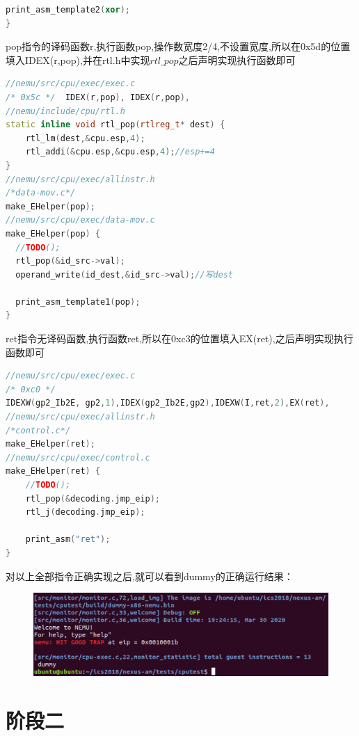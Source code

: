 \documentclass[UTF8,a4paper,10pt]{ctexart}
\begin{document}
{\begin{lstlisting}[title=xor指令实现,frame=trbl,language={C++}]
  print_asm_template2(xor);
}
     \end{lstlisting}

     pop指令的译码函数r,执行函数pop,操作数宽度2/4,不设置宽度,所以在0x5d的位置填入IDEX(r,pop),并在rtl.h中实现$rtl\_pop$之后声明实现执行函数即可
    \begin{lstlisting}[title=pop指令实现,frame=trbl,language={C++}]
//nemu/src/cpu/exec/exec.c
/* 0x5c */	IDEX(r,pop), IDEX(r,pop),
//nemu/include/cpu/rtl.h
static inline void rtl_pop(rtlreg_t* dest) {
	rtl_lm(dest,&cpu.esp,4);
	rtl_addi(&cpu.esp,&cpu.esp,4);//esp+=4
}
//nemu/src/cpu/exec/allinstr.h
/*data-mov.c*/
make_EHelper(pop);
//nemu/src/cpu/exec/data-mov.c
make_EHelper(pop) {
  //TODO();
  rtl_pop(&id_src->val);
  operand_write(id_dest,&id_src->val);//写dest

  print_asm_template1(pop);
}
     \end{lstlisting}

     ret指令无译码函数,执行函数ret,所以在0xc3的位置填入EX(ret),之后声明实现执行函数即可
    \begin{lstlisting}[title=ret指令实现,frame=trbl,language={C++}]
//nemu/src/cpu/exec/exec.c
/* 0xc0 */
IDEXW(gp2_Ib2E, gp2,1),IDEX(gp2_Ib2E,gp2),IDEXW(I,ret,2),EX(ret),
//nemu/src/cpu/exec/allinstr.h
/*control.c*/
make_EHelper(ret);
//nemu/src/cpu/exec/control.c
make_EHelper(ret) {
    //TODO();
	rtl_pop(&decoding.jmp_eip);
	rtl_j(decoding.jmp_eip);

    print_asm("ret");
}
     \end{lstlisting}

     对以上全部指令正确实现之后,就可以看到dummy的正确运行结果：
     \begin{figure}[H]
        \centering
        \includegraphics[scale=0.3]{fig/8.png}
        \caption{}
    \end{figure}
}  
\section{阶段二}
\end{document}
